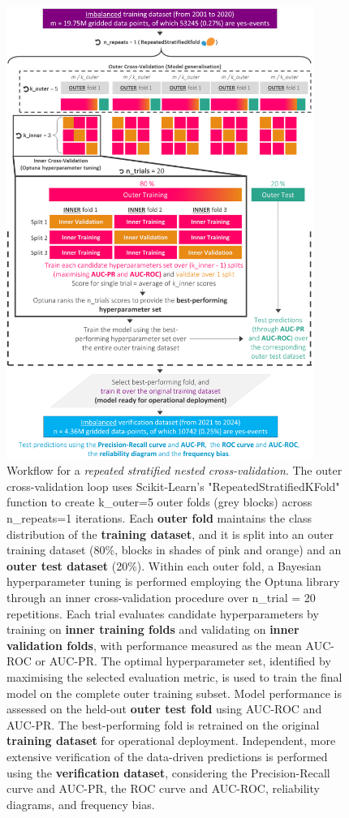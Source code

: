 \documentclass[nhess, manuscript]{copernicus}
\begin{document}
\begin{figure}[t]
\includegraphics[width=10cm]{figures/cv_optuna.png}
\caption{Workflow for a \textit{repeated stratified nested cross-validation}. The outer cross-validation loop uses Scikit-Learn's "RepeatedStratifiedKFold" function to create k\_outer=5 outer folds (grey blocks) across n\_repeats=1 iterations. Each \textcolor{colourOuterFolds}{\textbf{outer fold}} maintains the class distribution of the \textcolor{colourTraining}{\textbf{training dataset}}, and it is split into an outer training dataset (80\%, blocks in shades of pink and orange) and an \textcolor{colourOuterTest}{\textbf{outer test dataset}} (20\%). Within each outer fold, a Bayesian hyperparameter tuning is performed employing the Optuna library through an inner cross-validation procedure over n\_trial = 20 repetitions. Each trial evaluates candidate hyperparameters by training on \textcolor{colourInnerTraining}{\textbf{inner training folds}} and validating on \textcolor{colourInnerValidation}{\textbf{inner validation folds}}, with performance measured as the mean AUC-ROC or AUC-PR. The optimal hyperparameter set, identified by maximising the selected evaluation metric, is used to train the final model on the complete outer training subset. Model performance is assessed on the held-out \textcolor{colourOuterTest}{\textbf{outer test fold}} using AUC-ROC and AUC-PR. The best-performing fold is retrained on the original \textcolor{colourTraining}{\textbf{training dataset}} for operational deployment. Independent, more extensive verification of the data-driven predictions is performed using the \textcolor{colourTest}{\textbf{verification dataset}}, considering the Precision-Recall curve and AUC-PR, the ROC curve and AUC-ROC, reliability diagrams, and frequency bias.}
\label{fig:cv_optuna}
\end{figure}
\end{document}
